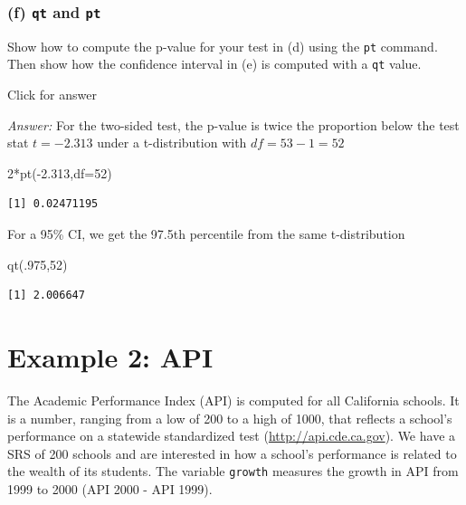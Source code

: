 \documentclass[
]{book}
\newenvironment{Shaded}{\begin{snugshade}}{\end{snugshade}}
\newcommand{\AttributeTok}[1]{\textcolor[rgb]{0.77,0.63,0.00}{#1}}
\newcommand{\DecValTok}[1]{\textcolor[rgb]{0.00,0.00,0.81}{#1}}
\newcommand{\FloatTok}[1]{\textcolor[rgb]{0.00,0.00,0.81}{#1}}
\newcommand{\FunctionTok}[1]{\textcolor[rgb]{0.00,0.00,0.00}{#1}}
\newcommand{\NormalTok}[1]{#1}
\newcommand{\SpecialCharTok}[1]{\textcolor[rgb]{0.00,0.00,0.00}{#1}}
\begin{document}
\hypertarget{f-qt-and-pt-1}{%
\subsubsection{\texorpdfstring{(f) \texttt{qt} and \texttt{pt}}{(f) qt and pt}}\label{f-qt-and-pt-1}}

Show how to compute the p-value for your test in (d) using the \texttt{pt} command. Then show how the confidence interval in (e) is computed with a \texttt{qt} value.

Click for answer

\emph{Answer:} For the two-sided test, the p-value is twice the proportion below the test stat \(t=-2.313\) under a t-distribution with \(df=53-1=52\)

\begin{Shaded}
\begin{Highlighting}[]
\DecValTok{2}\SpecialCharTok{*}\FunctionTok{pt}\NormalTok{(}\SpecialCharTok{{-}}\FloatTok{2.313}\NormalTok{,}\AttributeTok{df=}\DecValTok{52}\NormalTok{)}
\end{Highlighting}
\end{Shaded}

\begin{verbatim}
[1] 0.02471195
\end{verbatim}

For a 95\% CI, we get the 97.5th percentile from the same t-distribution

\begin{Shaded}
\begin{Highlighting}[]
\FunctionTok{qt}\NormalTok{(.}\DecValTok{975}\NormalTok{,}\DecValTok{52}\NormalTok{)}
\end{Highlighting}
\end{Shaded}

\begin{verbatim}
[1] 2.006647
\end{verbatim}

\hypertarget{example-2-api}{%
\section{Example 2: API}\label{example-2-api}}

The Academic Performance Index (API) is computed for all California schools. It is a number, ranging from a low of 200 to a high of 1000, that reflects a school's performance on a statewide standardized test (\url{http://api.cde.ca.gov}). We have a SRS of 200 schools and are interested in how a school's performance is related to the wealth of its students. The variable \texttt{growth} measures the growth in API from 1999 to 2000 (API 2000 - API 1999).
\end{document}
